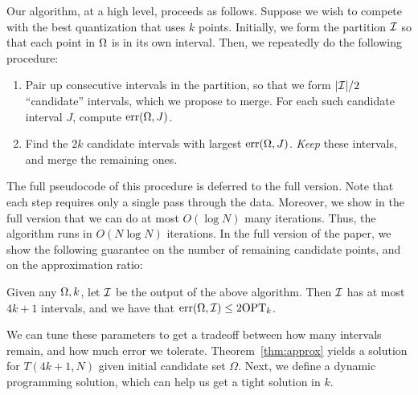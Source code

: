 Our algorithm, at a high level, proceeds as follows.
Suppose we wish to compete with the best quantization that uses $k$ points.
Initially, we form the partition $\mathcal{I}$ so that each point in $\Omega$ is in its own interval.
Then, we repeatedly do the following procedure:
\begin{enumerate}
\item
Pair up consecutive intervals in the partition, so that we form $|\mathcal{I}| / 2$ ``candidate'' intervals, which we propose to merge.
For each such candidate interval $J$, compute $\mathrm{err}(\Omega, J)$.
\item
Find the $2 k$ candidate intervals with largest $\mathrm{err} (\Omega, J)$.
\emph{Keep} these intervals, and merge the remaining ones.
\end{enumerate}

The full pseudocode of this procedure is deferred to the full version. 
Note that each step requires only a single pass through the data. 
Moreover, we show in the full version that we can do at most $O(\log N )$ many iterations. 
Thus, the algorithm runs in $O(N \log N)$ iterations.
In the full version of the paper, we show the following guarantee on the number of remaining candidate points, and on the approximation ratio:
\begin{theorem}
\label{thm:approx}
Given any $\Omega, k$, let $\mathcal{I}$ be the output of the above algorithm.
Then $\mathcal{I}$ has at most $4k + 1$ intervals, and we have that $\mathrm{err} (\Omega, \mathcal{I}) \leq 2 \mathrm{OPT}_k$.
\end{theorem}
We can tune these parameters to get a tradeoff between how many intervals remain, and how much error we tolerate. 
Theorem~\ref{thm:approx} yields a solution for $T(4k + 1, N)$ given initial candidate set $\Omega$.
Next, we define a dynamic programming solution, which can help us get a tight solution in $k$. 



